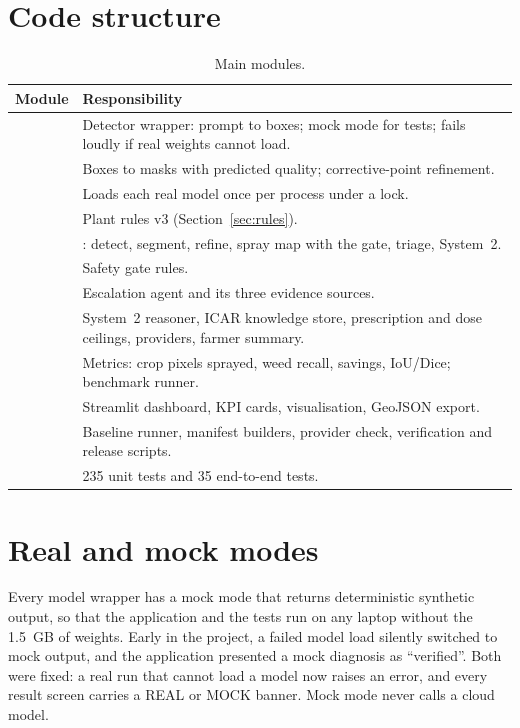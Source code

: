 \section{Code structure}
\begin{table}[H]
\centering
\caption{Main modules.}\label{tab:modules}
\begin{small}
\begin{tabularx}{\textwidth}{@{}>{\raggedright\arraybackslash\footnotesize}p{6.2cm}Y@{}}
\toprule
\textbf{Module} & \textbf{Responsibility}\\
\midrule
{} & Detector wrapper: prompt to boxes; mock mode for tests; fails loudly if real weights cannot load.\\
 & Boxes to masks with predicted quality; corrective-point refinement.\\
 & Loads each real model once per process under a lock.\\
 & Plant rules v3 (Section~\ref{sec:rules}).\\
 & : detect, segment, refine, spray map with the gate, triage, System~2.\\
 & Safety gate rules.\\
 & Escalation agent and its three evidence sources.\\
 & System~2 reasoner, ICAR knowledge store, prescription and dose ceilings, providers, farmer summary.\\
 & Metrics: crop pixels sprayed, weed recall, savings, IoU/Dice; benchmark runner.\\
 & Streamlit dashboard, KPI cards, visualisation, GeoJSON export.\\
 & Baseline runner, manifest builders, provider check, verification and release scripts.\\
 & 235 unit tests and 35 end-to-end tests.\\
\bottomrule
\end{tabularx}
\end{small}
\end{table}

\section{Real and mock modes}
Every model wrapper has a mock mode that returns deterministic synthetic output, so that the
application and the tests run on any laptop without the 1.5~GB of weights. Early in the project, a
failed model load silently switched to mock output, and the application presented a mock diagnosis as
``verified''. Both were fixed: a real run that cannot load a model now raises an error, and every
result screen carries a REAL or MOCK banner. Mock mode never calls a cloud model.


